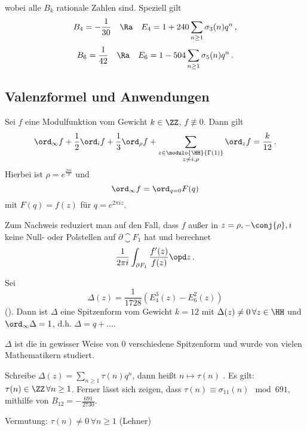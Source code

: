 wobei alle $B_k$ rationale Zahlen sind. Speziell gilt 
\[
B_4 = -\frac 1{30} \quad \Ra \quad E_4 = 1 + 240 \sum_{n \geq 1} \sigma_3 (n) q^n
\,,
\]
\[
B_6 = \frac 1{42} \quad \Ra \quad E_6 = 1 - 504 \sum_{n \geq 1} \sigma_5 (n) q^n
\,.
\]

\subsection{Valenzformel und Anwendungen}

\begin{satz}[Valenzformel]
Sei $f$ eine Modulfunktion vom Gewicht $k \in \ZZ$, $f \not \equiv 0$. Dann gilt
\[
\ord_\infty f + \frac 12 \ord_i f + \frac 13 \ord_\rho f + \sum_{\substack{z \in \modulo{\HH}{\Gamma(1)}\\ z \not \sim i, \rho}} \ord_z f = \frac {k}{12}
\,.
\]
Hierbei ist $\rho = e^{\frac{2 \pi i}{3}}$ und
\[
\ord_\infty f = \ord_{q = 0} F(q)
\]
mit $F(q) = f(z)$ für $q = e^{2\pi i z}$.


Zum Nachweis reduziert man auf den Fall, dass $f$ außer in $z = \rho, - \conj{\rho}, i$ keine Null- oder Polstellen auf $\partial \closure{F_1}$ hat und berechnet
\[
\frac{1}{2\pi i} \int_{\partial F_1} \frac{f'(z)}{f(z)} \opd z
\,.
\]

\end{satz}

\begin{defi}
Sei
\[
\Delta (z) = \frac{1}{1728} \left( E_4^3(z) - E_6^2(z) \right)
\]
(). Dann ist $\Delta$ eine Spitzenform vom Gewicht $k = 12$ mit $\Delta(z) \neq 0 \, \forall z \in \HH$ und $\ord_\infty \Delta = 1$, d.h. $\Delta = q + \ldots$.
\end{defi}

\begin{beme}
$\Delta$ ist die in gewisser Weise  von 0 verschiedene Spitzenform und wurde von vielen Mathematikern studiert.

\begin{bsp-list}
\item Schreibe $\Delta(z) = \sum_{n \geq 1} \tau (n) q^n$, dann heißt $n \mapsto \tau (n)$ . Es gilt: $\tau (n) \in \ZZ \, \forall n \geq 1$. Ferner lässt sich zeigen, dass $\tau (n) \equiv \sigma_{11}(n) \mod 691$, mithilfe von $B_{12} = - \frac{691}{2730}$.
\item Vermutung: $\tau (n) \neq 0 \, \forall n \geq 1$ (Lehner)
\end{bsp-list}

\end{beme}

